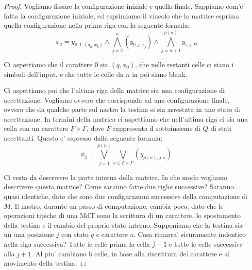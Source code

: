 \begin{proof}
    Vogliamo fissare la configurazione iniziale e quella finale. Sappiamo com'e' fatta la configurazione
    iniziale, ed esprimiamo il vincolo che la matrice esprima quella configurazione nella prima riga con
    la seguente formula:
    \begin{equation*}
        \phi_{2} = y_{0,1,(q_{0},x_{0})} \land \bigwedge_{j=2}^{n}(y_{0,j,x_{j}}) \land
        \bigwedge_{j=n+1}^{p(n)}y_{i,j,B}
    \end{equation*}

    Ci aspettiamo che il carattere 0 sia $(q,x_{0})$, che nelle restanti celle ci siano i simboli
    dell'input, e che tutte le celle da $n$ in poi siano blank.

    Ci aspettiamo poi che l'ultima riga della matrice sia una configurazione di accettazione.
    Vogliamo ovvero che corrisponda ad una configurazione finale, ovvero che da qualche parte sul
    nastro la testina si sia arrestata in uno stato di accettazione. In termini della matrica ci
    aspettiamo che nell'ultima riga ci sia una cella con un carattere $F \times \Gamma$, dove $F$
    rappresenta il sottoinsieme di $Q$ di stati accettanti. Questo e' espresso dalla seguente
    formula:
    \begin{equation*}
        \phi_{3} = \bigvee_{j={1}}^{p(n)}\bigvee_{a \in F \times \Gamma}(y_{p(n),j,a})
    \end{equation*}

    Ci resta da descrivere la parte interna della matrice. In che modo vogliamo descrivere questa
    matrice? Come saranno fatte due righe successive? Saranno quasi identiche, dato che sono due
    configurazioni successive della computazione di $M$. Il nastro, durante un passo di
    computazione, cambia poco, dato che le operazioni tipiche di una MdT sono la scrittura di un
    carattere, lo spostamento della testina e il cambio del proprio stato interno. Supponiamo che la
    testina sia un una posizione $j$ con stato $q$ e carattere $a$. Cosa rimarra' sicuramente
    indentico nella riga successiva? Tutte le celle prima la cella $j-1$ e tutte le celle successive
    alla $j+1$. Al piu' cambiano 6 celle, in base alla riscrittura del carattere e al movimento
    della testina. 


\end{proof}
